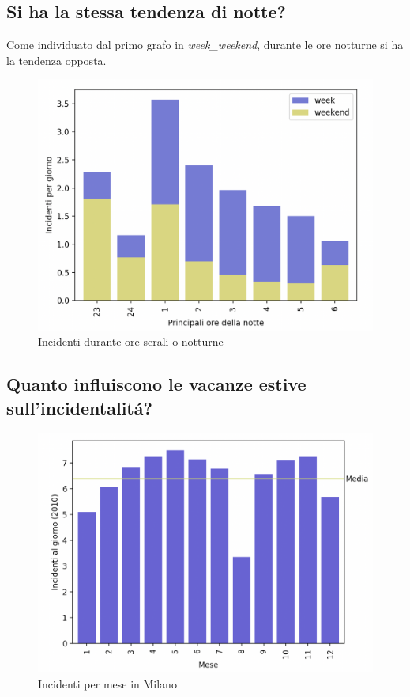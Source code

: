\documentclass[a4paper]{report}
\begin{document}

\subsection{Si ha la stessa tendenza di notte?}

Come individuato dal primo grafo in \textit{week\_weekend}, durante le 
ore notturne si ha la tendenza opposta.

\begin{figure}
    \includegraphics[width=\linewidth]{../src/incidenti/incidenti_senza_coords/ore_punta/ore_notte.png}
    \caption{Incidenti durante ore serali o notturne}
    \label{fig:ore_notte}
\end{figure}


\subsection{Quanto influiscono le vacanze estive sull'incidentalit\'a?}

\begin{figure}
    \includegraphics[width=\linewidth]{../src/incidenti/incidenti_senza_coords/mese_incidenti/milano_mese.png}
    \caption{Incidenti per mese in Milano}
    \label{fig:milano_mese}
\end{figure}
\end{document}
